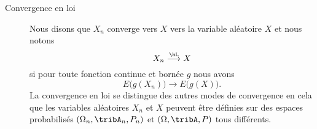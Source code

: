 \begin{definition}
\begin{description}
		\item[Convergence en loi]
		      Nous disons que \( X_n\) converge vers \( X\)  vers la variable aléatoire \( X\) et nous notons
		      \begin{equation}		\label{EQooWSMPooHCyPwk}
			      X_n\stackrel{\hL}{\longrightarrow}X
		      \end{equation}
		      si pour toute fonction continue et bornée \( g\) nous avons
		      \begin{equation}
			      E\big( g(X_n) \big)\to E\big( g(X) \big).
		      \end{equation}
		      La convergence en loi se distingue des autres modes de convergence en cela que les variables aléatoires \( X_n\) et \( X\) peuvent être définies sur des espaces probabilisés \( (\Omega_n,\tribA_n,P_n)\) et \( (\Omega,\tribA,P)\) tous différents.
	\end{description}
\end{definition}

